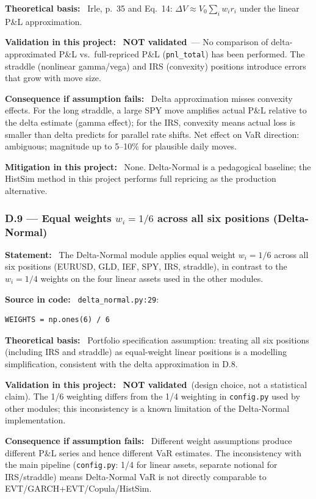 \documentclass[11pt,a4paper]{article}
\newcommand{\asmfield}[1]{\medskip\noindent\textbf{#1:}\ }
\newcommand{\code}[1]{\texttt{#1}}
\newcommand{\notvalidated}{\textbf{NOT validated}}
\begin{document}
\asmfield{Theoretical basis}
Irle, p.~35 and Eq.~14: $\Delta V \approx V_0 \sum_i w_i r_i$ under the
linear P\&L approximation.

\asmfield{Validation in this project}
\notvalidated\ --- No comparison of delta-approximated P\&L vs.\ full-repriced
P\&L (\code{pnl\_total}) has been performed. The straddle (nonlinear gamma/vega)
and IRS (convexity) positions introduce errors that grow with move size.

\asmfield{Consequence if assumption fails}
Delta approximation misses convexity effects. For the long straddle, a large
SPY move amplifies actual P\&L relative to the delta estimate (gamma effect);
for the IRS, convexity means actual loss is smaller than delta predicts
for parallel rate shifts. Net effect on VaR direction: ambiguous; magnitude
up to 5--10\% for plausible daily moves.

\asmfield{Mitigation in this project}
None. Delta-Normal is a pedagogical baseline; the HistSim method in this
project performs full repricing as the production alternative.

\subsubsection{D.9 --- Equal weights $w_i = 1/6$ across all six positions (Delta-Normal)}\label{asm:D9}

\asmfield{Statement}
The Delta-Normal module applies equal weight $w_i = 1/6$ across all six
positions (EURUSD, GLD, IEF, SPY, IRS, straddle), in contrast to the
$w_i = 1/4$ weights on the four linear assets used in the other modules.

\asmfield{Source in code}
\code{delta\_normal.py:29}:
\begin{lstlisting}
WEIGHTS = np.ones(6) / 6
\end{lstlisting}

\asmfield{Theoretical basis}
Portfolio specification assumption: treating all six positions (including
IRS and straddle) as equal-weight linear positions is a modelling
simplification, consistent with the delta approximation in D.8.

\asmfield{Validation in this project}
\notvalidated\ (design choice, not a statistical claim). The 1/6 weighting
differs from the 1/4 weighting in \code{config.py} used by other modules;
this inconsistency is a known limitation of the Delta-Normal implementation.

\asmfield{Consequence if assumption fails}
Different weight assumptions produce different P\&L series and hence
different VaR estimates. The inconsistency with the main pipeline
(\code{config.py}: 1/4 for linear assets, separate notional for IRS/straddle)
means Delta-Normal VaR is not directly comparable to EVT/GARCH+EVT/Copula/HistSim.
\end{document}
